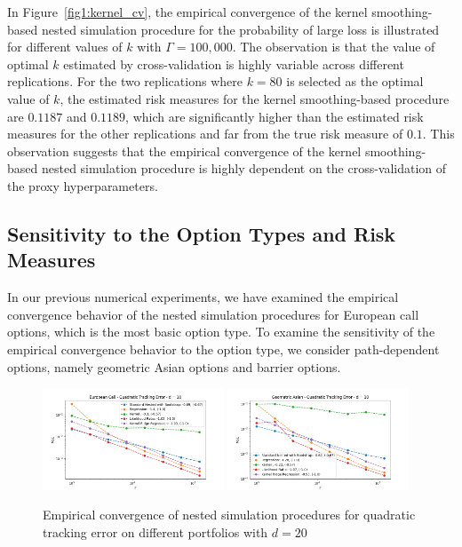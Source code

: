 In Figure~\ref{fig1:kernel_cv}, the empirical convergence of the kernel smoothing-based nested simulation procedure for the probability of large loss is illustrated for different values of $k$ with $\Gamma = 100,000$.
The observation is that the value of optimal $k$ estimated by cross-validation is highly variable across different replications.
For the two replications where $k = 80$ is selected as the optimal value of $k$, the estimated risk measures for the kernel smoothing-based procedure are $0.1187$ and $0.1189$, which are significantly higher than the estimated risk measures for the other replications and far from the true risk measure of $0.1$.
This observation suggests that the empirical convergence of the kernel smoothing-based nested simulation procedure is highly dependent on the cross-validation of the proxy hyperparameters.

\subsection{Sensitivity to the Option Types and Risk Measures} \label{sec1:sensitivity-option-type}

In our previous numerical experiments, we have examined the empirical convergence behavior of the nested simulation procedures for European call options, which is the most basic option type.
To examine the sensitivity of the empirical convergence behavior to the option type, we consider path-dependent options, namely geometric Asian options and barrier options.

\begin{figure}[ht!] 
    \centering
    \includegraphics[width=0.48\textwidth]{./project1/figures/figure6a.png}
    \includegraphics[width=0.48\textwidth]{./project1/figures/figure6b.png}
    \caption{Empirical convergence of nested simulation procedures for quadratic tracking error on different portfolios with $d=20$}
    \label{fig1:1x03} 
\end{figure}

